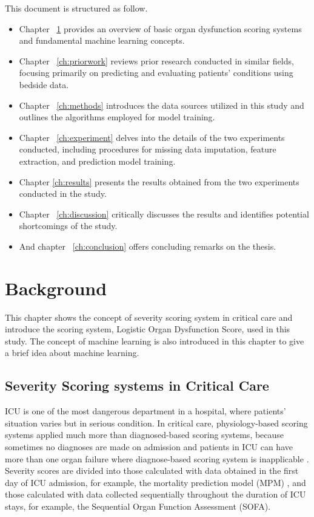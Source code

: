 \documentclass[12pt,a4paper,english
]{tunithesis}
\begin{document}
This document is structured as follow. 
\begin{itemize}
\item Chapter ~\ref{ch:background} provides an overview of basic organ dysfunction scoring systems and fundamental machine learning concepts.
\item Chapter ~\ref{ch:priorwork} reviews prior research conducted in similar fields, focusing primarily on predicting and evaluating patients' conditions using bedside data. 
\item Chapter ~\ref{ch:methods} introduces the data sources utilized in this study and outlines the algorithms employed for model training. 
\item Chapter ~\ref{ch:experiment} delves into the details of the two experiments conducted, including procedures for missing data imputation, feature extraction, and prediction model training.
\item Chapter \ref{ch:results} presents the results obtained from the two experiments conducted in the study.
\item Chapter ~\ref{ch:discussion} critically discusses the results and identifies potential shortcomings of the study.
\item And chapter ~\ref{ch:conclusion} offers concluding remarks on the thesis.
\end{itemize}


\chapter{Background}
\label{ch:background}
This chapter shows the concept of severity scoring system in critical care and introduce the scoring system, Logistic Organ Dysfunction Score, used in this study. The concept of machine learning is also introduced in this chapter to give a brief idea about machine learning.

\section{Severity Scoring systems in Critical Care}
ICU is one of the most dangerous department in a hospital, where patients' situation varies but in serious condition. In critical care, physiology-based scoring systems applied much more than diagnosed-based scoring systems, because sometimes no diagnoses are made on admission and patients in ICU can have more than one organ failure where diagnose-based scoring system is inapplicable \parencite{Bouch2008}. Severity scores are divided into those calculated with data obtained in the first day of ICU admission, for example, the mortality prediction model (MPM) \parencite{Lemeshow1993}, and those calculated with data collected sequentially throughout the duration of ICU stays, for example, the Sequential Organ Function Assessment (SOFA). 
\end{document}
